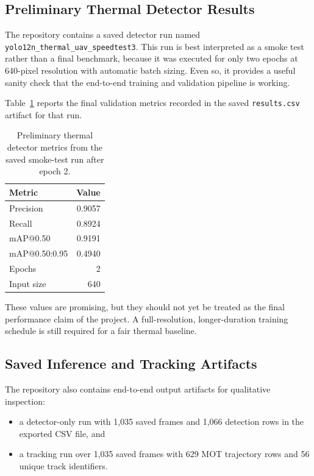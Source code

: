 \documentclass[10pt,conference]{IEEEtran}
\begin{document}
\subsection{Preliminary Thermal Detector Results}
The repository contains a saved detector run named \texttt{yolo12n\_thermal\_uav\_speedtest3}. This run is best interpreted as a smoke test rather than a final benchmark, because it was executed for only two epochs at 640-pixel resolution with automatic batch sizing. Even so, it provides a useful sanity check that the end-to-end training and validation pipeline is working.

Table~\ref{tab:detector-results} reports the final validation metrics recorded in the saved \texttt{results.csv} artifact for that run.

\begin{table}[t]
\centering
\caption{Preliminary thermal detector metrics from the saved smoke-test run after epoch 2.}
\label{tab:detector-results}
\begin{tabular}{lr}
\toprule
\textbf{Metric} & \textbf{Value} \\
\midrule
Precision & 0.9057 \\
Recall & 0.8924 \\
mAP@0.50 & 0.9191 \\
mAP@0.50:0.95 & 0.4940 \\
Epochs & 2 \\
Input size & 640 \\
\bottomrule
\end{tabular}
\end{table}

These values are promising, but they should not yet be treated as the final performance claim of the project. A full-resolution, longer-duration training schedule is still required for a fair thermal baseline.

\subsection{Saved Inference and Tracking Artifacts}
The repository also contains end-to-end output artifacts for qualitative inspection:

\begin{itemize}[leftmargin=1.5em]
    \item a detector-only run with 1,035 saved frames and 1,066 detection rows in the exported CSV file, and
    \item a tracking run over 1,035 saved frames with 629 MOT trajectory rows and 56 unique track identifiers.
\end{itemize}
\end{document}
